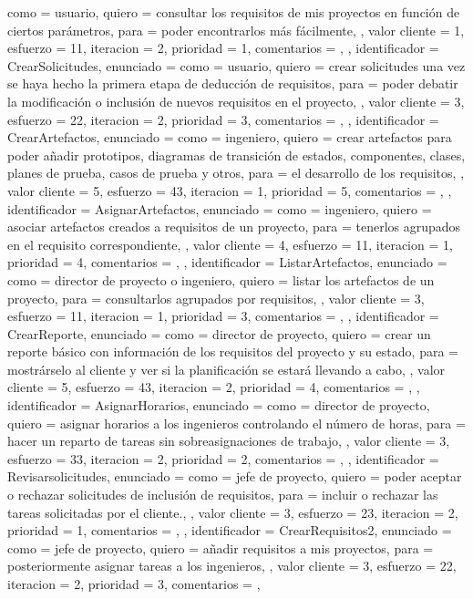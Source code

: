 \documentclass[a4paper, 12pt, spanish]{memoria}
\begin{document}
{{{    como = {usuario},
    quiero = {consultar los requisitos de mis proyectos en función de ciertos parámetros},
    para = {poder encontrarlos más fácilmente},
  },
  valor cliente = 1,
  esfuerzo      = {1}{1},
  iteracion     = 2,
  prioridad     = 1,
  comentarios   = {},
},{%
  identificador = CrearSolicitudes,
  enunciado     = {%
    como = {usuario},
    quiero = {crear solicitudes una vez se haya hecho la primera etapa de deducción de requisitos},
    para = {poder debatir la modificación o inclusión de nuevos requisitos en el proyecto},
  },
  valor cliente = 3,
  esfuerzo      = {2}{2},
  iteracion     = 2,
  prioridad     = 3,
  comentarios   = {},
},{%
  identificador = CrearArtefactos,
  enunciado     = {%
    como = {ingeniero},
    quiero = {crear artefactos para poder añadir prototipos, diagramas de transición de estados, componentes, clases, planes de prueba, casos de prueba y otros},
    para = {el desarrollo de los requisitos},
  },
  valor cliente = 5,
  esfuerzo      = {4}{3},
  iteracion     = 1,
  prioridad     = 5,
  comentarios   = {},
},{%
  identificador = AsignarArtefactos,
  enunciado     = {%
    como = {ingeniero},
    quiero = {asociar artefactos creados a requisitos de un proyecto},
    para = {tenerlos agrupados en el requisito correspondiente},
},
  valor cliente = 4,
  esfuerzo      = {1}{1},
  iteracion     = 1,
  prioridad     = 4,
  comentarios   = {},
},{%
  identificador = ListarArtefactos,
  enunciado     = {%
    como = {director de proyecto o ingeniero},
    quiero = {listar los artefactos de un proyecto},
    para = {consultarlos agrupados por requisitos},
  },
  valor cliente = 3,
  esfuerzo      = {1}{1},
  iteracion     = 1,
  prioridad     = 3,
  comentarios   = {},
},{%
  identificador = CrearReporte,
  enunciado     = {%
    como = {director de proyecto},
    quiero = {crear un reporte básico con información de los requisitos del proyecto y su estado},
    para = {mostrárselo al cliente y ver si la planificación se estará llevando a cabo},
  },
  valor cliente = 5,
  esfuerzo      = {4}{3},
  iteracion     = 2,
  prioridad     = 4,
  comentarios   = {},
},{%
  identificador = AsignarHorarios,
  enunciado     = {%
    como = {director de proyecto},
    quiero = {asignar horarios a los ingenieros controlando el número de horas},
    para = {hacer un reparto de tareas sin sobreasignaciones de trabajo},
  },
  valor cliente = 3,
  esfuerzo      = {3}{3},
  iteracion     = 2,
  prioridad     = 2,
  comentarios   = {},
},{%
  identificador = Revisarsolicitudes,
  enunciado     = {%
    como = {jefe de proyecto},
    quiero = {poder aceptar o rechazar solicitudes de inclusión de requisitos},
    para = {incluir o rechazar las tareas solicitadas por el cliente.},
  },
  valor cliente = 3,
  esfuerzo      = {2}{3},
  iteracion     = 2,
  prioridad     = 1,
  comentarios   = {},
},{%
  identificador = CrearRequisitos2,
  enunciado     = {%
    como = {jefe de proyecto},
    quiero = {añadir requisitos a mis proyectos},
    para = {posteriormente asignar tareas a los ingenieros},
  },
  valor cliente = 3,
  esfuerzo      = {2}{2},
  iteracion     = 2,
  prioridad     = 3,
  comentarios   = {},
}} %
\end{document}
